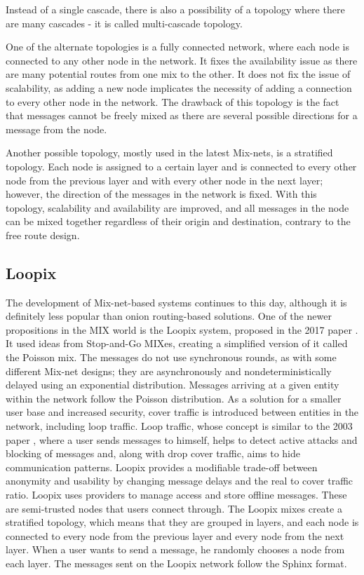 Instead of a single cascade, there is also a possibility of a topology where there are many cascades - it is called multi-cascade topology.

One of the alternate topologies is a fully connected network, where each node is connected to any other node in the network. It fixes the availability issue as there are many potential routes from one mix to the other. It does not fix the issue of scalability, as adding a new node implicates the necessity of adding a connection to every other node in the network. The drawback of this topology is the fact that messages cannot be freely mixed as there are several possible directions for a message from the node.

Another possible topology, mostly used in the latest Mix-nets, is a stratified topology. Each node is assigned to a certain layer and is connected to every other node from the previous layer and with every other node in the next layer; however, the direction of the messages in the network is fixed. With this topology, scalability and availability are improved, and all messages in the node can be mixed together regardless of their origin and destination, contrary to the free route design.

\subsection{Loopix}
The development of Mix-net-based systems continues to this day, although it is definitely less popular than onion routing-based solutions. One of the newer propositions in the MIX world is the Loopix system, proposed in the 2017 paper \cite{loopix}. It used ideas from Stop-and-Go MIXes, creating a simplified version of it called the Poisson mix. The messages do not use synchronous rounds, as with some different Mix-net designs; they are asynchronously and nondeterministically delayed using an exponential distribution. Messages arriving at a given entity within the network follow the Poisson distribution. As a solution for a smaller user base and increased security, cover traffic is introduced between entities in the network, including loop traffic. Loop traffic, whose concept is similar to the 2003 paper \cite{n-1}, where a user sends messages to himself, helps to detect active attacks and blocking of messages and, along with drop cover traffic, aims to hide communication patterns. Loopix provides a modifiable trade-off between anonymity and usability by changing message delays and the real to cover traffic ratio. Loopix uses providers to manage access and store offline messages. These are semi-trusted nodes that users connect through. The Loopix mixes create a stratified topology, which means that they are grouped in layers, and each node is connected to every node from the previous layer and every node from the next layer. When a user wants to send a message, he randomly chooses a node from each layer. The messages sent on the Loopix network follow the Sphinx format.

